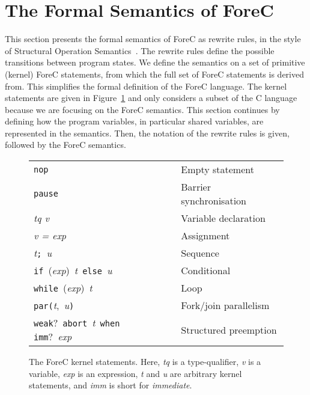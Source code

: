 \section{The Formal Semantics of ForeC}
\label{sec:formalSemantics}
This section presents the formal semantics of ForeC as rewrite rules,
in the style of Structural Operation Semantics~\cite{semantics_sos}. The rewrite rules 
define the possible transitions between program states. We define the
semantics on a set of primitive (kernel) ForeC statements, from which 
the full set of ForeC statements is derived from. This simplifies the 
formal definition of the ForeC language. The kernel statements are 
given in Figure~\ref{fig:forec_kernel} and only considers a subset of 
the C language because we are focusing on the ForeC semantics.
This section continues by defining how the program variables, in particular 
shared variables, are represented in the semantics. Then, the 
notation of the rewrite rules is given, followed by the ForeC semantics.

\begin{figure}[!h]
	\centering

	\begin{tabular}{l l l}
		\verb$nop$																& & Empty statement					\\
		\verb$pause$															& & Barrier synchronisation			\\
		\emph{tq v}																& & Variable declaration			\\
		\emph{v = exp}															& & Assignment						\\
		\emph{t}\verb$;$~\emph{u}												& & Sequence						\\
		\verb$if$~(\emph{exp})~\emph{t}~\verb$else$~\emph{u}					& & Conditional						\\
		\verb$while$~(\emph{exp})~\emph{t}										& & Loop							\\
		\verb$par($\emph{t},~\emph{u}\verb$)$									& & Fork/join parallelism			\\
		\verb$weak$?~\verb$abort$~\emph{t}~\verb$when imm$?~\emph{exp}			& & Structured preemption
	\end{tabular}
	
	\caption{The ForeC kernel statements. Here, \emph{tq} is a type-qualifier, \emph{v} is a variable, 
			 \emph{exp} is an expression, \emph{t} and \emph{u} are arbitrary kernel statements, and 
			 \emph{imm} is short for \emph{immediate}.}
	\label{fig:forec_kernel}
\end{figure}

